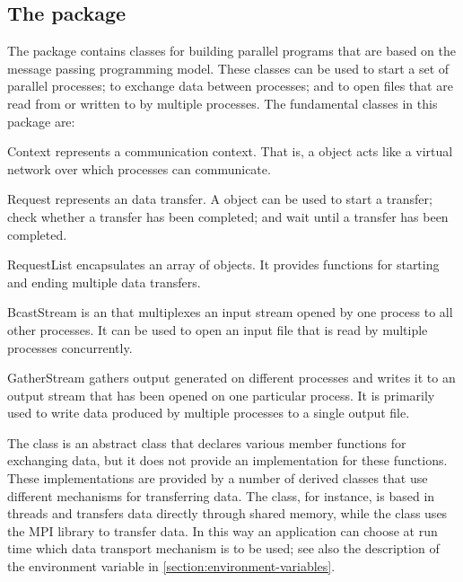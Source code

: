 \documentclass[a4paper,10pt]{article}
\begin{document}
\subsection{The  package}

The  package contains classes for building parallel programs
that are based on the message passing programming model. These classes
can be used to start a set of parallel processes; to exchange data
between processes; and to open files that are read from or written to by
multiple processes. The fundamental classes in this package are:
\begin{Description}[\Code]

\item[Context] represents a communication context. That is, a
   object acts like a virtual network over which processes
  can communicate.

\item[Request] represents an data transfer. A  object can
  be used to start a transfer; check whether a transfer has been
  completed; and wait until a transfer has been completed.

\item[RequestList] encapsulates an array of  objects. It
  provides functions for starting and ending multiple data transfers.

\item[BcastStream] is an  that multiplexes an input
  stream opened by one process to all other processes. It can be used to
  open an input file that is read by multiple processes concurrently.

\item[GatherStream] gathers output generated on different processes and
  writes it to an output stream that has been opened on one particular
  process. It is primarily used to write data produced by multiple
  processes to a single output file.

\end{Description}
The  class is an abstract class that declares various
member functions for exchanging data, but it does not provide an
implementation for these functions. These implementations are provided by
a number of derived classes that use different mechanisms for
transferring data. The  class, for instance, is based in
threads and transfers data directly through shared memory, while the
 class uses the MPI library to transfer data. In this
way an application can choose at run time which data transport mechanism
is to be used; see also the description of the environment variable
\hyperref[envar:JEM-MP-DRIVER]{} in
\autoref{section:environment-variables}.
\end{document}
